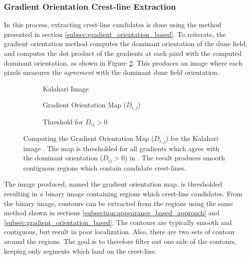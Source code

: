 \subsubsection{Gradient Orientation Crest-line Extraction}

In this process, extracting crest-line candidates is done using the method presented in section \ref{subsec:gradient_orientation_based}. To reiterate, the gradient orientation method computes the dominant orientation of the dune field, and computes the dot product of the gradients at each pixel with the computed dominant orientation, as shown in Figure \ref{fig:gradient_orientation_map_kalahari}. This produces an image where each pixels measures the \emph{agreement} with the dominant dune field orientation.  

\begin{figure}
	\centering
	\begin{subfigure}{0.48\textwidth}
		\centering
		\caption{Kalahari Image}
		\label{fig:gradient_orientation_kalahari_input}
	\end{subfigure}
	\begin{subfigure}{0.48\textwidth}
		\centering
		\caption{ Gradient Orientation Map ($D_{i,j}$) }
		\label{fig:gradient_orientation_map_kalahari}
	\end{subfigure}
	\begin{subfigure}{0.8\textwidth}
		\centering
		\caption{ Threshold for $D_{ij} > 0$ }
		\label{fig:threshold_gradient_orientation_map_kalahari}
	\end{subfigure}
	\caption{ Computing the Gradient Orientation Map  ($D_{i,j}$) for the Kalahari image . The map is thresholded for all gradients which agree with the dominant orientation ($D_{ij} > 0$) in . The result produces smooth contiguous regions which contain candidate crest-lines. }
	\label{fig:gradient_orientation_map}
\end{figure}

The image produced, named the gradient orientation map, is thresholded resulting in a binary image containing regions which crest-line candidates. From the binary image, contours can be extracted from the regions using the same method shown in sections \ref{subsection:appearance_based_approach} and \ref{subsec:gradient_orientation_based}. The contours are typically smooth and contiguous, but result in poor localization. Also, there are two sets of contour around the regions. The goal is to therefore filter out one side of the contours, keeping only segments which land on the crest-line.

